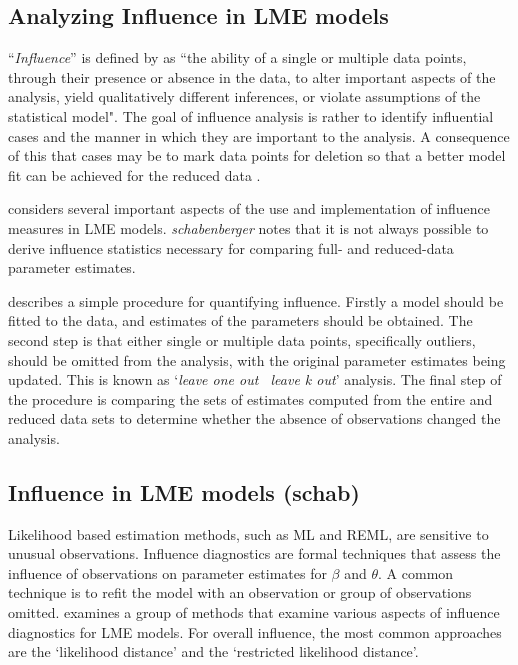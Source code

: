 \documentclass[12pt, a4paper]{report}
\theoremstyle{plain}
\theoremstyle{definition}
\theoremstyle{remark}
\begin{document}
\subsection{Analyzing Influence in LME models}
``\textit{Influence}” is defined by \citet{schab} as ``the ability of a single or multiple data points, through their presence
or absence in the data, to alter important aspects of the analysis, yield qualitatively different inferences, or
violate assumptions of the statistical model". The goal of influence analysis is rather to identify influential cases and the manner in
which they are important to the analysis. A consequence of this that cases may be to mark data
points for deletion so that a better model fit can be achieved for the reduced data \citep{schab}.  



\citet{schab} considers several important aspects of the use and implementation of influence measures in LME models. \textit{schabenberger} notes that it is not always possible to
derive influence statistics necessary for comparing full- and reduced-data parameter estimates. 

\citet{schab} describes a simple procedure for quantifying influence. Firstly a model should be fitted to the data, and
estimates of the parameters should be obtained. The second step is that either single or multiple data points, specifically outliers,
should be omitted from the analysis, with the original parameter estimates being updated. This is known as `\textit{leave one out \ leave k out}' analysis. The final step of the procedure is comparing the 	sets of estimates computed from the entire and reduced data sets to determine whether the absence of observations changed the
analysis.		


\subsection{Influence in LME models (schab)}
Likelihood based estimation methods, such as ML and REML, are sensitive to unusual observations. Influence diagnostics are formal techniques that assess the influence of observations on parameter estimates for $\beta$ and $\theta$. A common technique is to refit the model with an observation or group of observations omitted.\citet{west} examines a group of methods that examine various aspects of influence diagnostics for LME models.
For overall influence, the most common approaches are the `likelihood distance' and the `restricted likelihood distance'.
\end{document}
